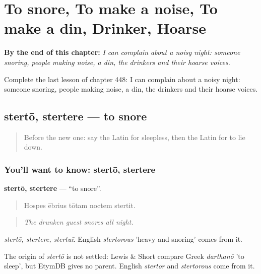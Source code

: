 
\chapter{To snore, To make a noise, To make a din, Drinker, Hoarse}
\label{ch:la-to-snore-to-make-a-noise-to-make-a-din-drinker-hoarse}

\begin{chapteropening}
\textbf{By the end of this chapter:} \emph{I can complain about a noisy night: someone snoring, people making noise, a din, the drinkers and their hoarse voices.}

Complete the last lesson of chapter 448: I can complain about a noisy night: someone snoring, people making noise, a din, the drinkers and their hoarse voices.
\end{chapteropening}

\section[stertō, stertere]{stertō, stertere — to snore}

\label{lesson:LA-C448-sterto}



\begin{quote}
Before the new one: say the Latin for sleepless, then the Latin for to lie down.
\end{quote}

\subsection*{You'll want to know: stertō, stertere}
\textbf{stertō, stertere} — \textquotedblleft{}to snore\textquotedblright{}.

\begin{quote}
Hospes ēbrius tōtam noctem stertit.
\end{quote}

\begin{quote}
\emph{The drunken guest snores all night.}
\end{quote}

\emph{stertō, stertere, stertuī}. English \emph{stertorous} 'heavy and snoring' comes from it.

\begin{cousinweb}
The origin of \emph{stertō} is not settled: Lewis \& Short compare Greek \emph{darthanō} 'to sleep', but EtymDB gives no parent. English \emph{stertor} and \emph{stertorous} come from it.
\end{cousinweb}


